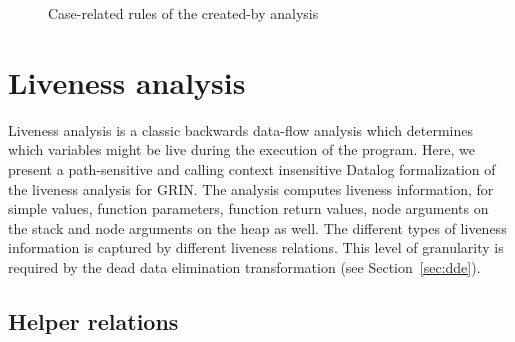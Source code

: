 \documentclass[main.tex]{subfiles}
\begin{document}
\begin{figure}[h]
  \caption{Case-related rules of the created-by analysis}
  \label{fig:cby-case}
  \end{figure}

  \section{Liveness analysis} \label{sec:lva}

	Liveness analysis is a classic backwards data-flow analysis which determines which variables might be live during the execution of the program. Here, we present a path-sensitive and calling context insensitive Datalog formalization of the liveness analysis for GRIN. The analysis computes liveness information, for simple values, function parameters, function return values, node arguments on the stack and node arguments on the heap as well. The different types of liveness information is captured by different liveness relations. This level of granularity is required by the dead data elimination transformation (see Section~\ref{sec:dde}).
	
	\subsection{Helper relations}
	
\end{document}
